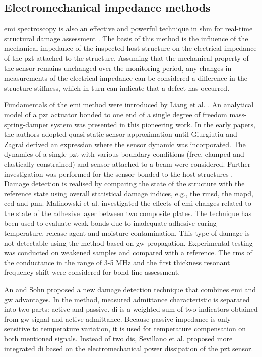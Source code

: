 \subsection{Electromechanical impedance methods}
\Ac{emi} spectroscopy is also an effective and powerful technique in \ac{shm} for real-time structural damage assessment \cite{park2003overview}.
The basis of this method is the influence of the mechanical impedance of the inspected host structure on the electrical impedance of the \ac{pzt} attached to the structure.
Assuming that the mechanical property of the sensor remains unchanged over the monitoring period, any changes in measurements of the electrical impedance can be considered a difference in the structure stiffness, which in turn can indicate that a defect has occurred.

Fundamentals of the \ac{emi} method were introduced by Liang et al. \cite{liang1994impedance}.
An analytical model of a \ac{pzt} actuator bonded to one end of a single degree of freedom mass-spring-damper system was presented in this pioneering work.
In the early papers, the authors adopted quasi-static sensor approximation until  Giurgiutiu and Zagrai \cite{giurgiutiu2000characterization} derived an expression where the sensor dynamic was incorporated.
The dynamics of a single \ac{pzt} with various boundary conditions (free, clamped and elastically constrained) and sensor attached to a beam were considered.
Further investigation was performed for the sensor bonded to the host structures \cite{zagrai2001electro, giurgiutiu2005damage}.
Damage detection is realised by comparing the state of the structure with the reference state using overall statistical damage indices, e.g., the \ac{rmsd}, the \ac{mapd}, \ac{ccd} and \ac{pnn}.
Malinowski et al. \cite{malinowski2014characterisation, malinowski2015use} investigated the effects of \ac{emi} changes related to the state of the adhesive layer between two composite plates.
The technique has been used to evaluate weak bonds due to inadequate adhesive curing temperature, release agent and moisture contamination. This type of damage is not detectable using the method based on \ac{gw} propagation.
Experimental testing was conducted on weakened samples and compared with a reference.
The \ac{rms} of the conductance in the range of 3-5 MHz and the first thickness resonant frequency shift were considered for bond-line assessment.

An and Sohn \cite{an2012integrated} proposed a new damage detection technique that combines \ac{emi} and \ac{gw} advantages.
In the method, measured admittance characteristic is separated into two parts: active and passive.
\Ac{di} is a weighted sum of two indicators obtained from \ac{gw} signal and active admittance.
Because passive impedance is only sensitive to temperature variation, it is used for temperature compensation on both mentioned signals.
Instead of two \acp{di}, Sevillano et al. \cite{sevillano2016damage} proposed more integrated \ac{di} based on the electromechanical power dissipation of the \ac{pzt} sensor.

